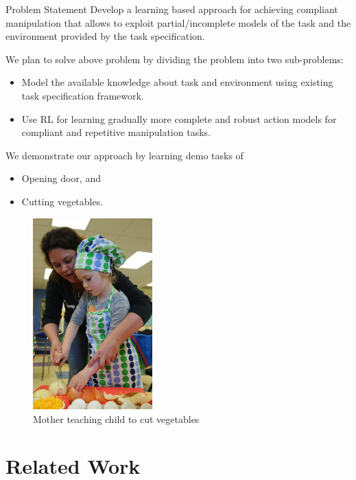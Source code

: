 \documentclass[aspectratio=43,10pt,fleqn,t]{beamer}
\begin{document}
\begin{frame}{Problem Statement}
Develop a learning based approach for achieving compliant manipulation that allows to exploit partial/incomplete models of the task and the environment provided by the task specification.
\vspace{0.5cm}

We plan to solve above problem by dividing the problem into two sub-problems:
\begin{itemize}
	\item Model the available knowledge about task and environment using existing task specification framework.

	\item Use RL for learning gradually more complete and robust action models for compliant and repetitive manipulation tasks.
\end{itemize}


	We demonstrate our approach by learning demo tasks of
\begin{itemize}
	\item Opening door, and
	\item Cutting vegetables.
\end{itemize}
\end{frame}

\begin{frame}
	\begin{figure}
		\includegraphics[width=0.41\textwidth]{images/mother_child}
		\caption{Mother teaching child to cut vegetables}
	\end{figure}
	\end{frame}
\section{Related Work}
\end{document}
